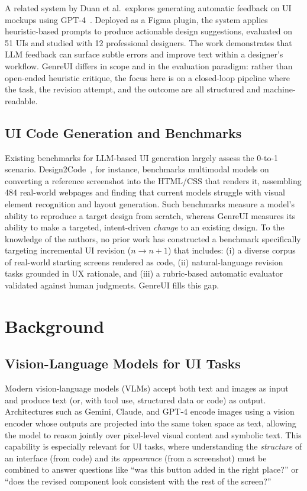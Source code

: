 \documentclass[sigconf,nonacm]{acmart}
\begin{document}
A related system by Duan et al.\ explores generating automatic feedback on UI mockups using GPT-4~\cite{duan2024feedback}. Deployed as a Figma plugin, the system applies heuristic-based prompts to produce actionable design suggestions, evaluated on 51 UIs and studied with 12 professional designers. The work demonstrates that LLM feedback can surface subtle errors and improve text within a designer's workflow. GenreUI differs in scope and in the evaluation paradigm: rather than open-ended heuristic critique, the focus here is on a closed-loop pipeline where the task, the revision attempt, and the outcome are all structured and machine-readable.

\subsection{UI Code Generation and Benchmarks}

Existing benchmarks for LLM-based UI generation largely assess the 0-to-1 scenario. Design2Code~\cite{si2025design2code}, for instance, benchmarks multimodal models on converting a reference screenshot into the HTML/CSS that renders it, assembling 484 real-world webpages and finding that current models struggle with visual element recognition and layout generation. Such benchmarks measure a model's ability to reproduce a target design from scratch, whereas GenreUI measures its ability to make a targeted, intent-driven \emph{change} to an existing design. To the knowledge of the authors, no prior work has constructed a benchmark specifically targeting incremental UI revision ($n \to n+1$) that includes: (i) a diverse corpus of real-world starting screens rendered as code, (ii) natural-language revision tasks grounded in UX rationale, and (iii) a rubric-based automatic evaluator validated against human judgments. GenreUI fills this gap.

\section{Background}
\label{sec:background}

\subsection{Vision-Language Models for UI Tasks}

Modern vision-language models (VLMs) accept both text and images as input and produce text (or, with tool use, structured data or code) as output. Architectures such as Gemini, Claude, and GPT-4 encode images using a vision encoder whose outputs are projected into the same token space as text, allowing the model to reason jointly over pixel-level visual content and symbolic text. This capability is especially relevant for UI tasks, where understanding the \emph{structure} of an interface (from code) and its \emph{appearance} (from a screenshot) must be combined to answer questions like ``was this button added in the right place?'' or ``does the revised component look consistent with the rest of the screen?''
\end{document}

